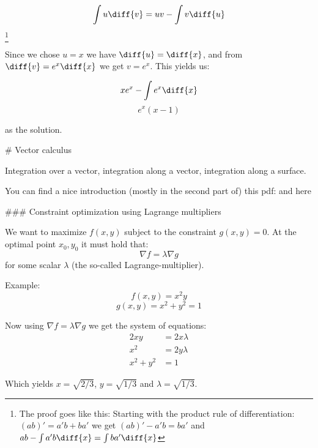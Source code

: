 $$ \int u \diff{v} = uv - \int v \diff{u} $$\footnote{The proof goes like this: Starting with the product rule of differentiation: $(ab)' = a'b + ba'$ we get $(ab)' - a'b = ba'$ and  $ab - \int a'b \diff{x} = \int ba' \diff{x} $}

Since we chose $u = x$ we have $\diff{u} = \diff{x}$, and from $\diff{v} = e^x \diff{x}$ we get $v = e^x$. This yields us: 

$$ xe^x - \int e^x \diff{x} $$
$$ e^x ( x - 1) $$

as the solution. 

# Vector calculus

Integration over a vector, integration along a vector, integration along a surface. 

You can find a nice introduction (mostly in the second part of) this pdf:  and here 


### Constraint optimization using Lagrange multipliers

We want to maximize $f(x, y)$ subject to the constraint $g(x, y) = 0$.
At the optimal point $x_0, y_0$ it must hold that:
\begin{equation}
  \nabla f = \lambda \nabla g
\end{equation}
for some scalar $\lambda$ (the so-called Lagrange-multiplier).

Example:
$$ f(x, y) = x^2 y $$
$$ g(x, y) = x^2 + y^2 = 1 $$

Now using $\nabla f = \lambda \nabla g$ we get the system of equations:
\begin{equation}
    \begin{aligned}
        2xy &= 2x\lambda \\
        x^2 &= 2y\lambda \\
        x^2 + y^2 &= 1
    \end{aligned}
\end{equation}

Which yields $x = \sqrt{2/3}$, $y = \sqrt{1/3}$ and $\lambda = \sqrt{1/3}$.
